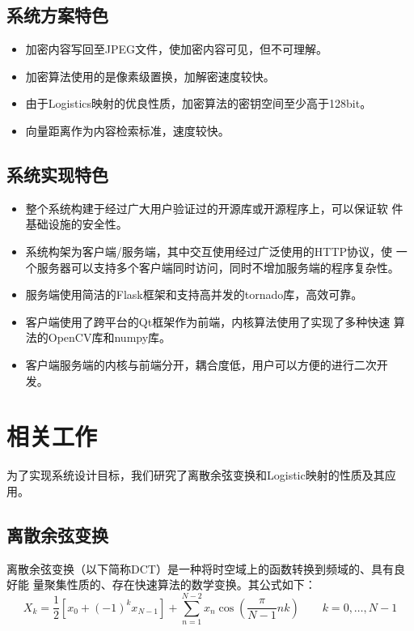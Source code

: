\subsection{系统方案特色}
\label{sec:sys-design-spec}
\begin{itemize}
\item 加密内容写回至JPEG文件，使加密内容可见，但不可理解。
\item 加密算法使用的是像素级置换，加解密速度较快。
\item 由于Logistics映射的优良性质\cite{li2011}，加密算法的密钥空间至少高于128bit。
\item 向量距离作为内容检索标准，速度较快。
\end{itemize}

\subsection{系统实现特色}
\label{sec:sys-impl-spec}
\begin{itemize}
\item 整个系统构建于经过广大用户验证过的开源库或开源程序上，可以保证软
件基础设施的安全性。
\item 系统构架为客户端/服务端，其中交互使用经过广泛使用的HTTP协议，使
一个服务器可以支持多个客户端同时访问，同时不增加服务端的程序复杂性。
\item 服务端使用简洁的Flask框架和支持高并发的tornado库，高效可靠。
\item 客户端使用了跨平台的Qt框架作为前端，内核算法使用了实现了多种快速
算法的OpenCV库和numpy库。
\item 客户端服务端的内核与前端分开，耦合度低，用户可以方便的进行二次开
发。
\end{itemize}

\section{相关工作}
\label{sec:related-work}
为了实现系统设计目标，我们研究了离散余弦变换和Logistic映射的性质及其应用。

\subsection{离散余弦变换}
离散余弦变换（以下简称DCT）是一种将时空域上的函数转换到频域的、具有良好能
量聚集性质的、存在快速算法的数学变换。其公式如下：
\begin{displaymath}
X_k = \frac1 2 \left[x_0 + \left(-1\right)^k x_{N - 1}\right] + \sum_{n = 1}^{N - 2} x_n \cos \left(
        \frac{\pi} {N - 1} n k \right) \qquad k = 0, \dotsc, N - 1
\end{displaymath}

